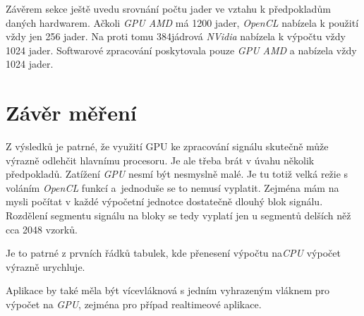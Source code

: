 Závěrem sekce ještě uvedu srovnání počtu jader ve vztahu k předpokladům daných hardwarem. Ačkoli \emph{GPU AMD} má 1200 jader, \emph{OpenCL} nabízela k použití vždy jen 256 jader. Na proti tomu 384jádrová \emph{NVidia} nabízela k výpočtu vždy 1024 jader. Softwarové zpracování poskytovala pouze \emph{GPU AMD} a nabízela vždy 1024 jader.

\section{Závěr měření}

Z výsledků je patrné, že využití {GPU} ke zpracování signálu skutečně může výrazně odlehčit hlavnímu procesoru. Je ale třeba brát v úvahu několik předpokladů. Zatížení \emph{GPU} nesmí být nesmyslně malé. Je tu totiž velká režie s voláním \emph{OpenCL} funkcí a~jednoduše se to nemusí vyplatit. Zejména mám na mysli počítat v každé výpočetní jednotce dostatečně dlouhý blok signálu. Rozdělení segmentu signálu na bloky se tedy vyplatí jen u segmentů delších něž cca 2048 vzorků.


 Je to patrné z prvních řádků tabulek, kde přenesení výpočtu na\emph{CPU} výpočet výrazně urychluje.

Aplikace by také měla být vícevláknová s jedním vyhrazeným vláknem pro výpočet na \emph{GPU}, zejména pro případ realtimeové aplikace.
